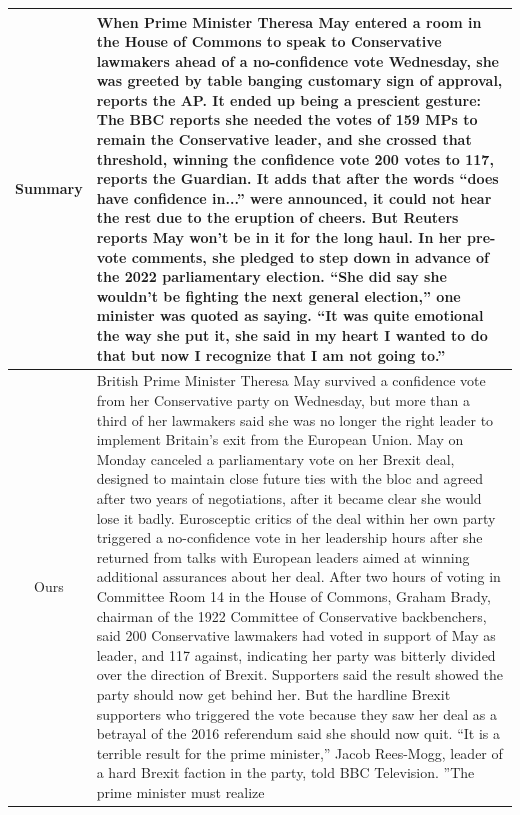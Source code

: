 \begin{table}[h!]
\begin{tabular}{c|p{}}
  Summary & When Prime Minister Theresa May entered a room in the House of Commons to speak to Conservative lawmakers ahead of a no-confidence vote Wednesday, she was greeted by table banging customary sign of approval, reports the AP. It ended up being a prescient gesture: The BBC reports she needed the votes of 159 MPs to remain the Conservative leader, and she crossed that threshold, winning the confidence vote 200 votes to 117, reports the Guardian. It adds that after the words ``does have confidence in...'' were announced, it could not hear the rest due to the eruption of cheers. But Reuters reports May won't be in it for the long haul. In her pre-vote comments, she pledged to step down in advance of the 2022 parliamentary election. ``She did say she wouldn't be fighting the next general election,'' one minister was quoted as saying. ``It was quite emotional the way she put it, she said in my heart I wanted to do that but now I recognize that I am not going to.'' \\\hline
  Ours & British Prime Minister Theresa May survived a confidence vote from her Conservative party on Wednesday, but more than a third of her lawmakers said she was no longer the right leader to implement Britain's exit from the European Union. May on Monday canceled a parliamentary vote on her Brexit deal, designed to maintain close future ties with the bloc and agreed after two years of negotiations, after it became clear she would lose it badly. Eurosceptic critics of the deal within her own party triggered a no-confidence vote in her leadership hours after she returned from talks with European leaders aimed at winning additional assurances about her deal. After two hours of voting in Committee Room 14 in the House of Commons, Graham Brady, chairman of the 1922 Committee of Conservative backbenchers, said 200 Conservative lawmakers had voted in support of May as leader, and 117 against, indicating her party was bitterly divided over the direction of Brexit. Supporters said the result showed the party should now get behind her. But the hardline Brexit supporters who triggered the vote because they saw her deal as a betrayal of the 2016 referendum said she should now quit. ``It is a terrible result for the prime minister,'' Jacob Rees-Mogg, leader of a hard Brexit faction in the party, told BBC Television. ''The prime minister must realize \\\hline
  

\end{tabular}
\end{table}

